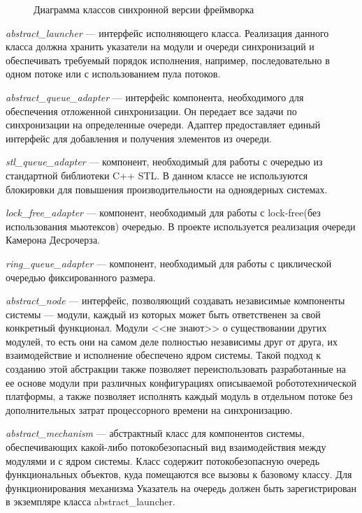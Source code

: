 \begin{figure}[h]
    \caption{Диаграмма классов синхронной версии фреймворка}
    \label{im:2_2_1_sync}
\end{figure}

\textit{abstract\_launcher} --- интерфейс исполняющего класса. Реализация данного класса должна хранить указатели на модули и очереди синхронизаций и обеспечивать требуемый порядок исполнения, например, последовательно в одном потоке или с использованием пула потоков.

\textit{abstract\_queue\_adapter} --- интерфейс компонента, 
необходимого для обеспечения отложенной синхронизации. Он 
передает все задачи по синхронизации на определенные очереди. 
Адаптер предоставляет единый интерфейс для добавления 
и получения элементов из очереди.

\textit{stl\_queue\_adapter} --- компонент, необходимый для работы с очередью из стандартной библиотеки C++ STL. В данном классе не используются блокировки для повышения производительности на одноядерных системах.

\textit{lock\_free\_adapter} --- компонент, необходимый для 
работы с lock-free(без использования мьютексов) очередью. В 
проекте используется реализация очереди Камерона Десрочерза.

\textit{ring\_queue\_adapter} --- компонент, необходимый для работы с  циклической очередью фиксированного размера.

\textit{abstract\_node} --- интерфейс, позволяющий создавать 
независимые компоненты системы --- модули, каждый из которых 
может быть ответственен за свой конкретный функционал. Модули 
<<не знают>> о существовании других модулей, то есть они на 
самом деле полностью независимы друг от друга, их взаимодействие 
и исполнение обеспечено ядром системы. Такой подход к созданию 
этой абстракции также позволяет переиспользовать разработанные 
на ее основе модули при различных конфигурациях описываемой 
робототехнической платформы, а также позволяет исполнять каждый 
модуль в отдельном потоке без дополнительных затрат 
процессорного времени на синхронизацию. 

\textit{abstract\_mechanism} --- абстрактный класс для компонентов системы, обеспечивающих какой-либо потокобезопасный вид взаимодействия между модулями и с ядром системы. Класс содержит потокобезопасную очередь функциональных объектов, куда помещаются все вызовы к базовому классу. Для функционирования механизма Указатель на очередь должен быть зарегистрирован в экземпляре класса abstract\_launcher.

